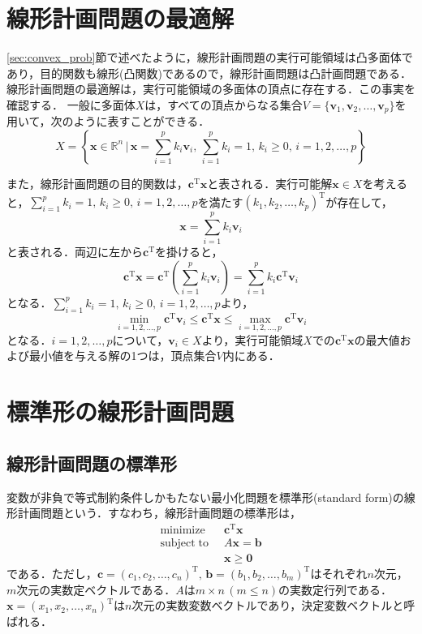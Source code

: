 \documentclass{jsreport}
\begin{document}
\section{線形計画問題の最適解}
\ref{sec:convex_prob}節で述べたように，線形計画問題の実行可能領域は凸多面体であり，目的関数も線形(凸関数)であるので，線形計画問題は凸計画問題である．線形計画問題の最適解は，実行可能領域の多面体の頂点に存在する．この事実を確認する．
一般に多面体$X$は，すべての頂点からなる集合$V = \{\bm{v}_1, \bm{v}_2, \ldots, \bm{v}_p\}$を用いて，次のように表すことができる．
\begin{equation}
  X = \left\{\bm{x} \in \mathbb{R}^n \, | \, \bm{x} = \sum_{i = 1}^p k_i \bm{v}_i , \, \sum_{i = 1}^p k_i = 1, \, k_i \geq 0, \, i = 1, 2, \ldots, p \right\} \nonumber
\end{equation}

また，線形計画問題の目的関数は，$\bm{c}^{\mathrm{T}}\bm{x}$と表される．実行可能解$\bm{x} \in X$を考えると，$\sum_{i = 1}^p k_i = 1, \, k_i \geq 0, \, i = 1, 2, \ldots, p$を満たす$(k_1, k_2, \ldots, k_p)^{\mathrm{T}}$が存在して，
\begin{equation}
  \bm{x} = \sum_{i = 1}^p k_i \bm{v}_i \nonumber
\end{equation}
と表される．両辺に左から$\bm{c}^{\mathrm{T}}$を掛けると，
\begin{equation}
  \bm{c}^{\mathrm{T}} \bm{x} = \bm{c}^{\mathrm{T}} \left(\sum_{i = 1}^p k_i \bm{v}_i \right) = \sum_{i = 1}^p k_i \bm{c}^{\mathrm{T}} \bm{v}_i \nonumber
\end{equation}
となる．$\sum_{i = 1}^p k_i = 1, \, k_i \geq 0, \, i = 1, 2, \ldots, p$より，
\begin{equation}
  \min_{i = 1, 2, \ldots, p} \bm{c}^{\mathrm{T}} \bm{v}_i \leq \bm{c}^{\mathrm{T}} \bm{x} \leq \max_{i = 1, 2, \ldots, p} \bm{c}^{\mathrm{T}} \bm{v}_i \nonumber
\end{equation}
となる．$i = 1, 2, \ldots, p$について，$\bm{v}_i \in X$より，実行可能領域$X$での$\bm{c}^{\mathrm{T}}\bm{x}$の最大値および最小値を与える解の1つは，頂点集合$V$内にある．

\section{標準形の線形計画問題}
\subsection{線形計画問題の標準形}
変数が非負で等式制約条件しかもたない最小化問題を標準形(standard form)の線形計画問題という．すなわち，線形計画問題の標準形は，
\begin{align}\label{eq:standard}
  \mathrm{minimize} \; \; &\bm{c}^{\mathrm{T}}\bm{x} \nonumber \\
  \mathrm{subject \; to} \; \; &A\bm{x} = \bm{b} \\
  &\bm{x} \geq \bm{0} \nonumber
\end{align}
である．ただし，$\bm{c} = (c_1, c_2, \ldots, c_n)^{\mathrm{T}}, \, \bm{b} = (b_1, b_2, \ldots, b_m)^{\mathrm{T}}$はそれぞれ$n$次元，$m$次元の実数定ベクトルである．$A$は$m \times n \, (m \leq n)$の実数定行列である．$\bm{x} = (x_1, x_2, \ldots, x_n)^{\mathrm{T}}$は$n$次元の実数変数ベクトルであり，決定変数ベクトルと呼ばれる．
\end{document}
